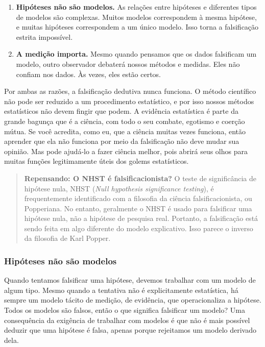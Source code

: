 \begin{enumerate}
  \item \textbf{Hipóteses não são modelos.} As relações entre hipóteses e diferentes tipos de modelos são complexas. Muitos modelos correspondem à mesma hipótese, e muitas hipóteses correspondem a um único modelo. Isso torna a falsificação estrita impossível.
  \item \textbf{A medição importa.} Mesmo quando pensamos que os dados falsificam um modelo, outro observador debaterá nossos métodos e medidas. Eles não confiam nos dados. Às vezes, eles estão certos.
\end{enumerate}

Por ambas as razões, a falsificação dedutiva nunca funciona. O método científico não pode ser reduzido a um procedimento estatístico, e por isso nossos métodos estatísticos não devem fingir que podem. A evidência estatística é parte da grande bagunça que é a ciência, com todo o seu combate, egotismo e coerção mútua. Se você acredita, como eu, que a ciência muitas vezes funciona, então aprender que ela não funciona por meio da falsificação não deve mudar sua opinião. Mas pode ajudá-lo a fazer ciência melhor, pois abrirá seus olhos para muitas funções legitimamente úteis dos golems estatísticos.

\begin{quote}
  \textbf{Repensando: O NHST é falsificacionista?} O teste de significância de hipótese nula, NHST (\textit{Null hypothesis significance testing}), é frequentemente identificado com a filosofia da ciência falsificacionista, ou Popperiana. No entanto, geralmente o NHST é usado para falsificar uma hipótese nula, não a hipótese de pesquisa real. Portanto, a falsificação está sendo feita em algo diferente do modelo explicativo. Isso parece o inverso da filosofia de Karl Popper.
\end{quote}

\subsubsection{Hipóteses não são modelos}

Quando tentamos falsificar uma hipótese, devemos trabalhar com um modelo de algum tipo. Mesmo quando a tentativa não é explicitamente estatística, há sempre um modelo tácito de medição, de evidência, que operacionaliza a hipótese. Todos os modelos são falsos, então o que significa falsificar um modelo? Uma consequência da exigência de trabalhar com modelos é que não é mais possível deduzir que uma hipótese é falsa, apenas porque rejeitamos um modelo derivado dela.

